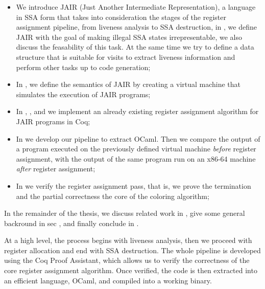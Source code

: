 \begin{itemize}
    \item We introduce JAIR (Just Another Intermediate Representation), a language in SSA form that takes into consideration the stages of the register assignment pipeline, from liveness analysis to SSA destruction, in , we define JAIR with the goal of making illegal SSA states irrepresentable, we also discuss the feasability of this task. At the same time we try to define a data structure that is suitable for visits to extract liveness information and perform other tasks up to code generation;

    \item In , we define the semantics of JAIR by creating a virtual machine that simulates the execution of JAIR programs;

    \item In , , and  we implement an already existing register assignment algorithm for JAIR programs in Coq;

    \item In  we develop our pipeline to extract OCaml. Then we compare the output of a program executed on the previously defined virtual machine \textit{before} register assignment, with the output of the same program run on an x86-64 machine \textit{after} register assignment;

    \item In  we verify the register assignment pass, that is, we prove the termination and the {\color{red} partial correctness} the core of the coloring algorithm;
\end{itemize}

In the remainder of the thesis, we discuss related work in , give some general backround in sec , and finally conclude in .

At a high level, the process begins with liveness analysis, then we proceed with register allocation and end with SSA destruction. The whole pipeline is developed using the Coq Proof Assistant, which allows us to verify the correctness of the core register assignment algorithm. Once verified, the code is then extracted into an efficient language, OCaml, and compiled into a working binary.